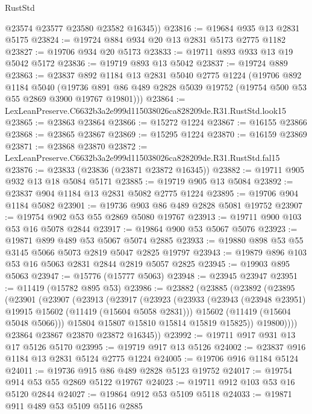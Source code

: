 \begin{lexlean}{RustStd}
\begin{coremodule}
        @23574
        @23577
        @23580
        @23582
        @16345))
@23816 := @19684 @935 @13 @2831 @5175
@23824 := @19724 @884 @934 @20 @13 @2831 @5173 @2775 @1182
@23827 := @19706 @934 @20 @5173
@23833 := @19711 @893 @933 @13 @19 @5042 @5172
@23836 := @19719 @893 @13 @5042
@23837 := @19724 @889
@23863 := @23837
    @892
    @1184
    @13
    @2831
    @5040
    @2775
    @1224
    (@19706
      @892
      @1184
      @5040
      (@19736 @891 @86 @489 @2828 @5039 @19752 (@19754 @500 @53 @55 @2869 @3900 @19767 @19801)))
@23864 := LexLeanPreserve.C6632b3a2e999d115038026ca828209de.R31.RustStd.look15
@23865 := @23863 @23864
@23866 := @15272 @1224
@23867 := @16155 @23866
@23868 := @23865 @23867
@23869 := @15295 @1224
@23870 := @16159 @23869
@23871 := @23868 @23870
@23872 := LexLeanPreserve.C6632b3a2e999d115038026ca828209de.R31.RustStd.fal15
@23876 := @23833 (@23836 (@23871 @23872 @16345))
@23882 := @19711 @905 @932 @13 @18 @5084 @5171
@23885 := @19719 @905 @13 @5084
@23892 := @23837 @904 @1184 @13 @2831 @5082 @2775 @1224
@23895 := @19706 @904 @1184 @5082
@23901 := @19736 @903 @86 @489 @2828 @5081 @19752
@23907 := @19754 @902 @53 @55 @2869 @5080 @19767
@23913 := @19711 @900 @103 @53 @16 @5078 @2844
@23917 := @19864 @900 @53 @5067 @5076
@23923 := @19871 @899 @489 @53 @5067 @5074 @2885
@23933 := @19880 @898 @53 @55 @3145 @5066 @5073 @2819 @5047 @2825 @19797
@23943 := @19879 @896 @103 @53 @16 @5063 @2831 @2844 @2819 @5057 @2825
@23945 := @19903 @895 @5063
@23947 := @15776 (@15777 @5063)
@23948 := @23945 @23947
@23951 := @11419 (@15782 @895 @53)
@23986 := @23882
    (@23885
      (@23892
        (@23895
          (@23901
            (@23907
              (@23913
                (@23917
                  (@23923
                    (@23933
                      (@23943 (@23948 @23951) @19915 @15602 (@11419 (@15604 @5058 @2831)))
                      @15602
                      (@11419 (@15604 @5048 @5066)))
                    @15804
                    @15807
                    @15810
                    @15814
                    @15819
                    @15825))
                @19800))))
        @23864
        @23867
        @23870
        @23872
        @16345))
@23992 := @19711 @917 @931 @13 @17 @5126 @5170
@23995 := @19719 @917 @13 @5126
@24002 := @23837 @916 @1184 @13 @2831 @5124 @2775 @1224
@24005 := @19706 @916 @1184 @5124
@24011 := @19736 @915 @86 @489 @2828 @5123 @19752
@24017 := @19754 @914 @53 @55 @2869 @5122 @19767
@24023 := @19711 @912 @103 @53 @16 @5120 @2844
@24027 := @19864 @912 @53 @5109 @5118
@24033 := @19871 @911 @489 @53 @5109 @5116 @2885

\end{coremodule}
\end{lexlean}
